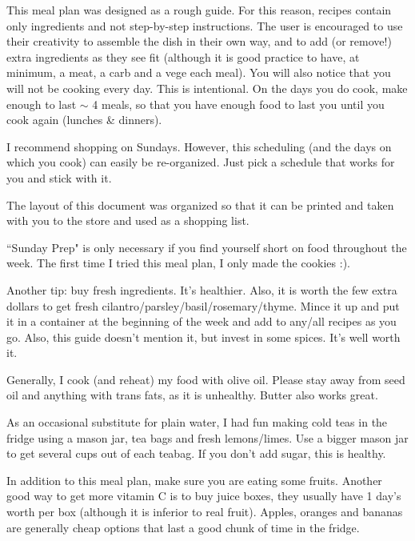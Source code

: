 \documentclass[11pt, a4paper]{article}
\begin{document}
This meal plan was designed as a rough guide. For this reason, recipes contain only ingredients and not step-by-step instructions. The user is encouraged to use their creativity to assemble the dish in their own way, and to add (or remove!) extra ingredients as they see fit (although it is good practice to have, at minimum, a meat, a carb and a vege each meal). You will also notice that you will not be cooking every day. This is intentional. On the days you do cook, make enough to last $\sim$ 4 meals, so that you have enough food to last you until you cook again (lunches \& dinners). 
\par
I recommend shopping on Sundays. However, this scheduling (and the days on which you cook) can easily be re-organized. Just pick a schedule that works for you and stick with it. 
\par
The layout of this document was organized so that it can be printed and taken with you to the store and used as a shopping list.
\par
``Sunday Prep" is only necessary if you find yourself short on food throughout the week. The first time I tried this meal plan, I only made the cookies :). 
\par
Another tip: buy fresh ingredients. It's healthier. Also, it is worth the few extra dollars to get fresh cilantro/parsley/basil/rosemary/thyme. Mince it up and put it in a container at the beginning of the week and add to any/all recipes as you go. Also, this guide doesn't mention it, but invest in some spices. It's well worth it. 
\par
Generally, I cook (and reheat) my food with olive oil. Please stay away from seed oil and anything with trans fats, as it is unhealthy. Butter also works great. 
\par
As an occasional substitute for plain water, I had fun making cold teas in the fridge using a mason jar, tea bags and fresh lemons/limes. Use a bigger mason jar to get several cups out of each teabag. If you don't add sugar, this is healthy. 
\par
In addition to this meal plan, make sure you are eating some fruits. Another good way to get more vitamin C is to buy juice boxes, they usually have 1 day's worth per box (although it is inferior to real fruit). Apples, oranges and bananas are generally cheap options that last a good chunk of time in the fridge. 


\pagebreak
\tableofcontents

\end{document}
